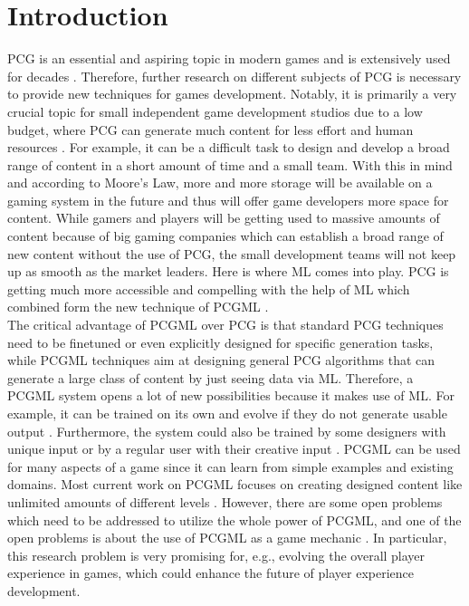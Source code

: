 \documentclass[MGS,Master,english]{twbook}%
\begin{document}
\chapter{Introduction}
\ac{PCG} is an essential and aspiring topic in modern games and is extensively used for decades \cite{pcg::whatIsPCG}. Therefore, further research on different subjects of \ac{PCG} is necessary to provide new techniques for games development. Notably, it is primarily a very crucial topic for small independent game development studios due to a low budget, where \ac{PCG} can generate much content for less effort and human resources \cite{pcg::shortHistoryOfDynamicAndPCG}. For example, it can be a difficult task to design and develop a broad range of content in a short amount of time and a small team. With this in mind and according to Moore’s Law, more and more storage will be available on a gaming system in the future and thus will offer game developers more space for content. While gamers and players will be getting used to massive amounts of content because of big gaming companies which can establish a broad range of new content without the use of PCG, the small development teams will not keep up as smooth as the market leaders. Here is where \ac{ML} comes into play. \ac{PCG} is getting much more accessible and compelling with the help of ML which combined form the new technique of \ac{PCGML} \cite{pcgml::paper}.\\
The critical advantage of PCGML over PCG is that standard PCG techniques need to be finetuned or even explicitly designed for specific generation tasks, while PCGML techniques aim at designing general PCG algorithms that can generate a large class of content by just seeing data via ML. Therefore, a \ac{PCGML} system opens a lot of new possibilities because it makes use of ML. For example, it can be trained on its own and evolve if they do not generate usable output \cite{pcgml::paper}. Furthermore, the system could also be trained by some designers with unique input or by a regular user with their creative input \cite{pcgml::paper}. \ac{PCGML} can be used for many aspects of a game since it can learn from simple examples and existing domains. Most current work on PCGML focuses on creating designed content like unlimited amounts of different levels \cite{pcgml::paper}. However, there are some open problems which need to be addressed to utilize the whole power of PCGML, and one of the open problems is about the use of PCGML as a game mechanic \cite{pcgml::paper}. In particular, this research problem is very promising for, e.g., evolving the overall player experience in games, which could enhance the future of player experience development.
\end{document}

